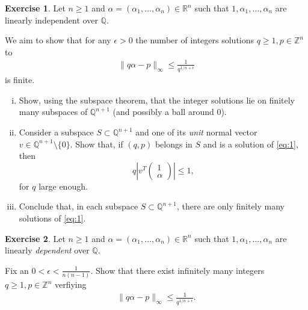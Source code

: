 \documentclass[12pt,a4paper]{article}
\theoremstyle{plain}
\newtheorem*{Sol*}{Solution}
\theoremstyle{definition}
\newtheorem{Ex}{Exercise}
\def \Q {\mathbb Q}
\def \R {\mathbb R}
\def \Z {\mathbb Z}
\newif\ifsolutions
\newcommand{\exercise}[2]{
			\begin{Ex} #1 \end{Ex}
			\ifsolutions  \begin{Sol*} #2 \end{Sol*} \bigskip \else \bigskip  \fi
		}
\begin{document}
\exercise{\label{ex:1}
	Let $n\geq1$ and $\alpha = (\alpha_1, \dots, \alpha_n) \in \R^n$ such that $1, \alpha_1, \dots, \alpha_n$ are linearly independent over $\Q$.

	We aim to show that for any $\epsilon > 0$ the number of integers solutions $q\geq1, p\in\Z^n$ to
		\begin{gather}
			 \| q \alpha - p \|_\infty \leq \frac{1}{q^{1/n + \epsilon}} \label{eq:1}
		\end{gather}
	is finite.

	\begin{enumerate}[i)]
		\item Show, using the subspace theorem, that the integer solutions lie on finitely many subspaces of $\Q^{n+1}$ (and possibly a ball around $0$).

		\item Consider a subspace $S \subset \Q^{n+1}$ and one of its \emph{unit} normal vector $v \in \Q^{n+1} \setminus\{0\}$.
			Show that, if $(q, p)$ belongs in $S$ and is a solution of \eqref{eq:1}, then
				\[ q \left| v^T \begin{pmatrix}1 \\ \alpha \end{pmatrix} \right| \leq 1, \]
			for $q$ large enough.
		
		\item Conclude that, in each subspace $S \subset \Q^{n+1}$, there are only finitely many solutions of \eqref{eq:1}.

	\end{enumerate}
}
{}


\exercise{
	Let $n\geq1$ and $\alpha = (\alpha_1, \dots, \alpha_n) \in \R^n$ such that $1, \alpha_1, \dots, \alpha_n$ are linearly \emph{dependent} over $\Q$.

	Fix an $0 < \epsilon < \frac{1}{n(n-1)}$.
	Show that there exist infinitely many integers $q\geq1, p\in\Z^n$ verfiying
		\begin{gather*}
			 \| q \alpha - p \|_\infty \leq \frac{1}{q^{1/n + \epsilon}}.
		\end{gather*}
}
{}
\end{document}
